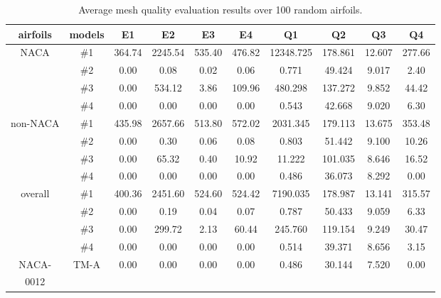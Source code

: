 \begin{table}[!htbp]
  \centering
  \caption{\small Average mesh quality evaluation results over 100 random airfoils.}
    \begin{adjustbox}{max width=\textwidth}
    \begin{tabular}{cccccccccc}
    \hline
    \hline
    airfoils & models & E1     & E2     & E3     & E4     & Q1     & Q2     & Q3     & Q4 \\
    \hline
    \multirow{4}[2]{*}{NACA} & \#1    & 364.74  & 2245.54  & 535.40  & 476.82  & 12348.725  & 178.861  & 12.607  & 277.66\\
           & \#2    & 0.00   & 0.08   & 0.02   & 0.06   & 0.771  & 49.424  & 9.017  & 2.40  \\
           & \#3    & 0.00   & 534.12  & 3.86   & 109.96  & 480.298  & 137.272  & 9.852  & 44.42  \\
           & \#4    & 0.00   & 0.00   & 0.00   & 0.00   & 0.543  & 42.668  & 9.020  & 6.30  \\
    \hline
    \multirow{4}[2]{*}{non-NACA} & \#1    & 435.98  & 2657.66  & 513.80  & 572.02  & 2031.345  & 179.113  & 13.675  & 353.48\\
           & \#2    & 0.00   & 0.30   & 0.06   & 0.08   & 0.803  & 51.442  & 9.100  & 10.26  \\
           & \#3    & 0.00   & 65.32  & 0.40   & 10.92  & 11.222  & 101.035  & 8.646  & 16.52  \\
           & \#4    & 0.00   & 0.00   & 0.00   & 0.00   & 0.486  & 36.073  & 8.292  & 0.00 \\
    \hline
    \multirow{4}[2]{*}{overall} & \#1    & 400.36  & 2451.60  & 524.60  & 524.42  & 7190.035  & 178.987  & 13.141  & 315.57 \\
           & \#2    & 0.00   & 0.19   & 0.04   & 0.07   & 0.787  & 50.433  & 9.059  & 6.33  \\
           & \#3    & 0.00   & 299.72  & 2.13   & 60.44  & 245.760  & 119.154  & 9.249  & 30.47  \\
           & \#4    & 0.00   & 0.00   & 0.00   & 0.00   & 0.514  & 39.371  & 8.656  & 3.15  \\
    \hline
    NACA-  & \multirow{2}[2]{*}{TM-A} & \multirow{2}[2]{*}{0.00 } & \multirow{2}[2]{*}{0.00 } & \multirow{2}[2]{*}{0.00 } & \multirow{2}[2]{*}{0.00 } & \multirow{2}[2]{*}{0.486 } & \multirow{2}[2]{*}{30.144 } & \multirow{2}[2]{*}{7.520 } & \multirow{2}[2]{*}{0.00 } \\
    0012   &    &        &        &        &        &        &        &        &  \\
    \hline
    \hline
    \end{tabular}%
    \end{adjustbox}

  \label{ch3:tab:mesh_check_results}%
\end{table}%